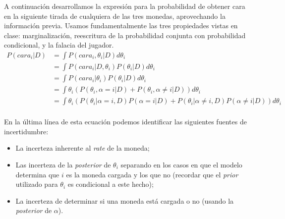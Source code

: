 A continuación desarrollamos la expresión para la probabilidad de obtener cara en la siguiente tirada de cualquiera de las tres monedas, aprovechando la información previa. Usamos fundamentalmente las tres propiedades vistas en clase: marginalización, reescritura de la probabilidad conjunta con probabilidad condicional, y la falacia del jugador.
  \begin{equation}
  \label{eq:4}
  \begin{aligned}
	P(cara_i|D) &= \int P(cara_i, \theta_i|D) d\theta_i \\
					&= \int P(cara_i|D, \theta_i)  P(\theta_i|D) d\theta_i \\
					&= \int P(cara_i|\theta_i)  P(\theta_i|D) d\theta_i \\ 
					&= \int \theta_i  (P(\theta_i, \alpha = i|D) + P(\theta_i, \alpha \neq i|D)) d\theta_i \\
					&= \int \theta_i  (P(\theta_i | \alpha = i,D) P(\alpha = i | D) + P(\theta_i | \alpha \neq i,D) P(\alpha \neq i | D)) d\theta_i \\
  \end{aligned}
  \end{equation}

En la última línea de esta ecuación podemos identificar las siguientes fuentes de incertidumbre:
\begin{itemize}
\item La incerteza inherente al \emph{rate} de la moneda;
\item Las incerteza de la \emph{posterior} de $\theta_i$ separando en los casos en que el modelo determina que $i$ es la moneda cargada y  los que no (recordar que el \emph{prior} utilizado para $\theta_i$ es condicional a este hecho);
\item La incerteza de determinar si una moneda está cargada o no (usando la \emph{posterior} de $\alpha$).
\end{itemize}


